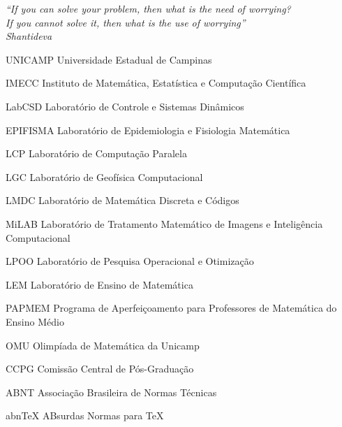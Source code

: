 \documentclass[
	oldfontcommands,
	sumario=tradicional,
	12pt,			%
	openright,		%
	oneside,		%
	a4paper,		%
	english,		%
	english			%
	]{imecc-unicamp}
\begin{document}
\begin{epigrafe}
    \vspace*{\fill}
    \begin{flushright}
      \textit{``If you can solve your problem, then what is the need of worrying? \\
        If you cannot solve it, then what is the use of worrying'' \\
        Shantideva
	}
    \end{flushright}
\end{epigrafe}

\listoffigures*
\cleardoublepage
\listoftables*
\cleardoublepage
\begin{siglas}
  \item[UNICAMP] Universidade Estadual de Campinas
  \item[IMECC] Instituto de Matemática, Estatística e Computação Científica
  \item[LabCSD] Laboratório de Controle e Sistemas Dinâmicos
  \item[EPIFISMA] Laboratório de Epidemiologia e Fisiologia Matemática
  \item[LCP] Laboratório de Computação Paralela
  \item[LGC] Laboratório de Geofísica Computacional
  \item[LMDC] Laboratório de Matemática Discreta e Códigos
  \item[MiLAB] Laboratório de Tratamento Matemático de Imagens e Inteligência Computacional
  \item[LPOO] Laboratório de Pesquisa Operacional e Otimização
  \item[LEM] Laboratório de Ensino de Matemática
  \item[PAPMEM] Programa de Aperfeiçoamento para Professores de Matemática do Ensino Médio
  \item[OMU] Olimpíada de Matemática da Unicamp
  \item[CCPG] Comissão Central de Pós-Graduação
  \item[ABNT] Associação Brasileira de Normas Técnicas
  \item[abnTeX] ABsurdas Normas para TeX
\end{siglas}
\end{document}
